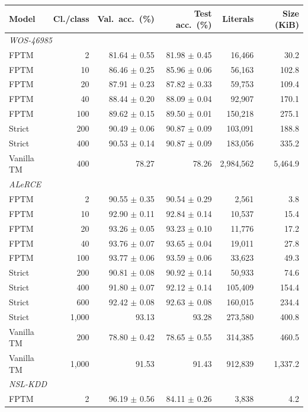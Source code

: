 \begin{tabular}{lrrrrr}
\toprule
Model & Cl./class & Val.\ acc.\ (\%) & Test acc.\ (\%) & Literals & Size (KiB) \\
\midrule
\multicolumn{6}{l}{\textit{WOS-46985}} \\
FPTM & 2 & 81.64 $\pm$ 0.55 & 81.98 $\pm$ 0.45 & 16,466 & 30.2 \\
FPTM & 10 & 86.46 $\pm$ 0.25 & 85.96 $\pm$ 0.06 & 56,163 & 102.8 \\
FPTM & 20 & 87.91 $\pm$ 0.23 & 87.82 $\pm$ 0.33 & 59,753 & 109.4 \\
FPTM & 40 & 88.44 $\pm$ 0.20 & 88.09 $\pm$ 0.04 & 92,907 & 170.1 \\
FPTM & 100 & 89.62 $\pm$ 0.15 & 89.50 $\pm$ 0.01 & 150,218 & 275.1 \\
Strict & 200 & 90.49 $\pm$ 0.06 & 90.87 $\pm$ 0.09 & 103,091 & 188.8 \\
Strict & 400 & 90.53 $\pm$ 0.14 & 90.87 $\pm$ 0.09 & 183,056 & 335.2 \\
Vanilla TM & 400 & 78.27 & 78.26 & 2,984,562 & 5,464.9 \\
\midrule
\multicolumn{6}{l}{\textit{ALeRCE}} \\
FPTM & 2 & 90.55 $\pm$ 0.35 & 90.54 $\pm$ 0.29 & 2,561 & 3.8 \\
FPTM & 10 & 92.90 $\pm$ 0.11 & 92.84 $\pm$ 0.14 & 10,537 & 15.4 \\
FPTM & 20 & 93.26 $\pm$ 0.05 & 93.23 $\pm$ 0.10 & 11,776 & 17.2 \\
FPTM & 40 & 93.76 $\pm$ 0.07 & 93.65 $\pm$ 0.04 & 19,011 & 27.8 \\
FPTM & 100 & 93.77 $\pm$ 0.06 & 93.59 $\pm$ 0.06 & 33,623 & 49.3 \\
Strict & 200 & 90.81 $\pm$ 0.08 & 90.92 $\pm$ 0.14 & 50,933 & 74.6 \\
Strict & 400 & 91.80 $\pm$ 0.07 & 92.12 $\pm$ 0.14 & 105,409 & 154.4 \\
Strict & 600 & 92.42 $\pm$ 0.08 & 92.63 $\pm$ 0.08 & 160,015 & 234.4 \\
Strict & 1,000 & 93.13 & 93.28 & 273,580 & 400.8 \\
Vanilla TM & 200 & 78.80 $\pm$ 0.42 & 78.65 $\pm$ 0.55 & 314,385 & 460.5 \\
Vanilla TM & 1,000 & 91.53 & 91.43 & 912,839 & 1,337.2 \\
\midrule
\multicolumn{6}{l}{\textit{NSL-KDD}} \\
FPTM & 2 & 96.19 $\pm$ 0.56 & 84.11 $\pm$ 0.26 & 3,838 & 4.2 \\

\end{tabular}
